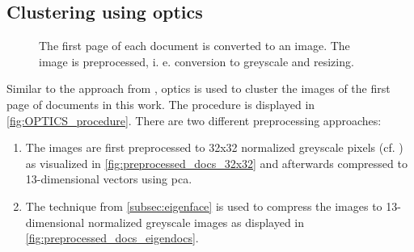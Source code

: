 \subsection{Clustering using \acs*{optics}}\label{subsec:impl-optics}

\begin{figure}[!htb] %
    \centering
    
    \caption[\ac{optics} procedure]{The first page of each document is converted to an image.
    The image is preprocessed, i. e. conversion to greyscale and resizing.
    }
    \label{fig:OPTICS_procedure}
\end{figure}

Similar to the approach from \citeauthor{OPTICS1999}, \ac{optics} is used to cluster the images of the first page of documents in this work.
The procedure is displayed in \autoref{fig:OPTICS_procedure}.
There are two different preprocessing approaches:
\begin{enumerate}
    \item \label{pt:32}The images are first preprocessed to 32x32 normalized greyscale pixels (cf. \cite{OPTICS1999}) 
    as visualized in \autoref{fig:preprocessed_docs_32x32}
    and afterwards compressed to 13-dimensional vectors using \ac{pca}.
    \item \label{pt:eigendocs}The technique \eigendocs{} from \autoref{subsec:eigenface} 
    is used to compress the images to 13-dimensional normalized greyscale images as displayed in \autoref{fig:preprocessed_docs_eigendocs}.
\end{enumerate}


